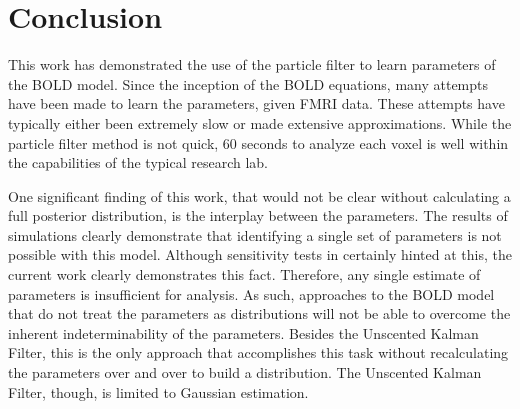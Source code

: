 \chapter{Conclusion}
\label{sec:Conclusion}
This work has demonstrated the use of the particle filter to
learn parameters of the BOLD model. Since the inception of the
BOLD equations, many attempts have been made to learn the parameters,
given FMRI data. These attempts have typically either been extremely 
slow or made extensive approximations. While the particle filter method
is not quick, 60 seconds to analyze each voxel is well within the capabilities
of the typical research lab. 

One significant finding of this work, that would not be clear without 
calculating a full posterior distribution, is the interplay 
between the parameters. The results of simulations clearly demonstrate
that identifying a single set of parameters is not possible with this 
model. Although sensitivity tests in \cite{Deneux2006} certainly hinted
at this, the current work clearly demonstrates this fact. Therefore,
any single estimate of parameters is insufficient for analysis. As such,
approaches to the BOLD model that do not treat the parameters as distributions
will not be able to overcome the inherent indeterminability of the
parameters. Besides the Unscented Kalman Filter, this is the only approach
that accomplishes this task without recalculating the parameters over and 
over to build a distribution. The Unscented Kalman Filter, though, is limited
to Gaussian estimation. 


